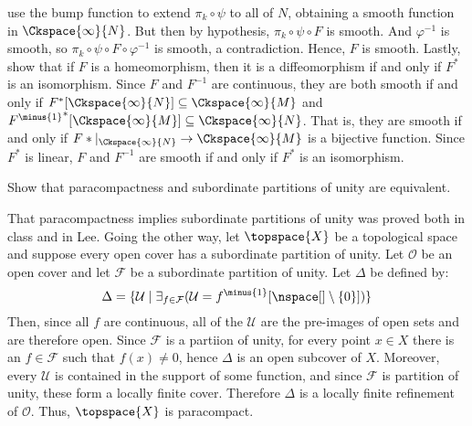 \documentclass{article}                                                        %
\begin{document}
\begin{solution}
            use the bump function to extend $\pi_{k}\circ\psi$ to all of $N$,
            obtaining a smooth function in $\Ckspace{\infty}{N}$. But then by
            hypothesis, $\pi_{k}\circ\psi\circ{F}$ is smooth. And
            $\varphi^{\minus{1}}$ is smooth, so
            $\pi_{k}\circ\psi\circ{F}\circ\varphi^{\minus{1}}$ is smooth,
            a contradiction. Hence, $F$ is smooth. Lastly, show that if $F$ is a
            homeomorphism, then it is a diffeomorphism if and only if $F^{*}$ is
            an isomorphism. Since $F$ and $F^{\minus{1}}$ are continuous, they
            are both smooth if and only if
            $F^{*}[\Ckspace{\infty}{N}]\subseteq\Ckspace{\infty}{M}$ and
            ${F^{\minus{1}}}^{*}[\Ckspace{\infty}{M}]%
             \subseteq\Ckspace{\infty}{N}$. That is, they are smooth if and only
            if $F*|_{\Ckspace{\infty}{N}}\rightarrow\Ckspace{\infty}{M}$ is a
            bijective function. Since $F^{*}$ is linear, $F$ and $F^{\minus{1}}$
            are smooth if and only if $F^{*}$ is an isomorphism.
        \end{solution}
        \begin{problem}
            Show that paracompactness and subordinate partitions of unity are
            equivalent.
        \end{problem}
        \begin{solution}
            That paracompactness implies subordinate partitions of unity was
            proved both in class and in Lee. Going the other way, let
            $\topspace{X}$ be a topological space and suppose every
            open cover has a subordinate partition of unity. Let $\mathcal{O}$
            be an open cover and let $\mathcal{F}$ be a subordinate partition of
            unity. Let $\Delta$ be defined by:
            \begin{equation}
                \Delta=\{\mathcal{U}\;|\;\exists_{f\in\mathcal{F}}
                (\mathcal{U}=f^{\minus{1}}[\nspace[]\setminus\{0\}])\}
            \end{equation}
            Then, since all $f$ are continuous, all of the $\mathcal{U}$ are the
            pre-images of open sets and are therefore open. Since $\mathcal{F}$
            is a partiion of unity, for every point $x\in{X}$ there is an
            $f\in\mathcal{F}$ such that $f(x)\ne{0}$, hence $\Delta$ is an open
            subcover of $X$. Moreover, every $\mathcal{U}$ is contained in the
            support of some function, and since $\mathcal{F}$ is partition of
            unity, these form a locally finite cover. Therefore $\Delta$ is a
            locally finite refinement of $\mathcal{O}$. Thus, $\topspace{X}$
            is paracompact.
        \end{solution}
\end{document}
